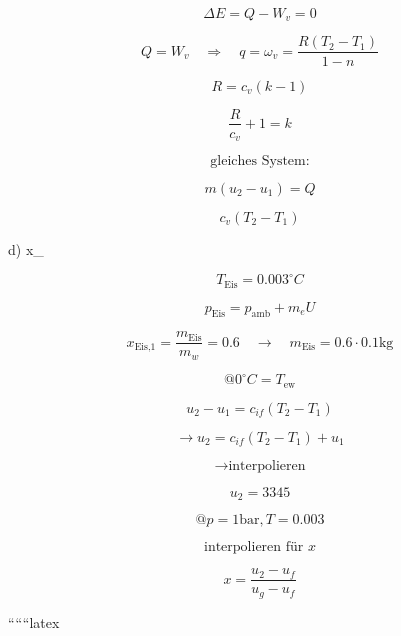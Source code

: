 \[
\Delta E = Q - W_v = 0
\]

\[
Q = W_v \quad \Rightarrow \quad q = \omega_v = \frac{R \left( T_2 - T_1 \right)}{1 - n}
\]

\[
R = c_v (k - 1)
\]

\[
\frac{R}{c_v} + 1 = k
\]

\[
\text{gleiches System:}
\]

\[
m (u_2 - u_1) = Q
\]

\[
c_v (T_2 - T_1)
\]

d) \quad x_{}

\[
T_{\text{Eis}} = 0.003^\circ C
\]

\[
p_{\text{Eis}} = p_{\text{amb}} + m_e U
\]

\[
x_{\text{Eis,1}} = \frac{m_{\text{Eis}}}{m_w} = 0.6 \quad \longrightarrow \quad m_{\text{Eis}} = 0.6 \cdot 0.1 \text{kg}
\]

\[
@ 0^\circ C = T_{\text{ew}}
\]

\[
u_2 - u_1 = c_{if} (T_2 - T_1)
\]

\[
\longrightarrow u_2 = c_{if} (T_2 - T_1) + u_1
\]

\[
\longrightarrow \text{interpolieren}
\]

\[
u_2 = 3345
\]

\[
@ p = 1 \text{bar}, T = 0.003
\]

\[
\text{interpolieren für } x
\]

\[
x = \frac{u_2 - u_f}{u_g - u_f}
\]

``````latex


